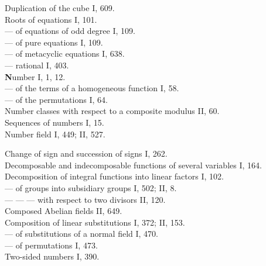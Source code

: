 \begin{flushleft}
Duplication of the cube I, 609. \\
Roots of equations I, 101. \\
— of equations of odd degree I, 109. \\
— of pure equations I, 109. %
\\
— of metacyclic equations I, 638. \\
— rational I, 403. \\[6pt]
\textbf{N}umber I, 1, 12. \\
— of the terms of a homogeneous function I, 58. \\
— of the permutations I, 64. \\
Number classes with respect to a composite modulus II, 60.
\\
Sequences of numbers I, 15. \\
Number field I, 449; II, 527.
\end{flushleft}

\begin{flushleft}
Change of sign and succession of signs I, 262. \\
Decomposable and indecomposable functions of several variables I, 164. \\
Decomposition of integral functions into linear factors I, 102. %
\\
— of groups into subsidiary groups I, 502; II, 8. \\
— — — with respect to two divisors II, 120. \\
Composed Abelian fields II, 649. \\
Composition of linear substitutions I, 372; II, 153. \\
— of substitutions of a normal field I, 470. \\
— of permutations I, 473. \\
Two-sided numbers I, 390.
\end{flushleft}
